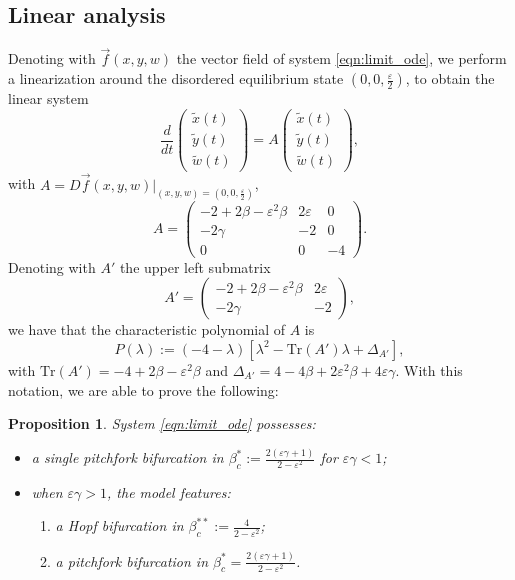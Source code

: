 \documentclass[a4paper,10pt,leqno]{amsart}
\theoremstyle{plain}
\newtheorem{prop}{Proposition}%
\begin{document}
\subsection{Linear analysis}
Denoting with $\overrightarrow{f}(x,y,w)$ the vector field of system \eqref{eqn:limit_ode}, we perform a linearization around the disordered equilibrium state $\left(0,0,\frac{\varepsilon}{2}\right)$, to obtain the linear system
\begin{equation}
\label{eqn:linear}
\frac{d}{dt}\left(\begin{matrix}
\tilde{x}(t)\\
\tilde{y}(t)\\
\tilde{w}(t)
\end{matrix} \right)= A \left(\begin{matrix}
\tilde{x}(t)\\
\tilde{y}(t)\\
\tilde{w}(t)
\end{matrix}\right),
\end{equation}
with $A = D\overrightarrow{f}(x,y,w)\vert_{(x,y,w) = \left(0,0,\frac{\varepsilon}{2}\right)}$, 
$$
A = \left(\begin{matrix}
-2 + 2\beta - \varepsilon^2 \beta & 2\varepsilon & 0\\
-2\gamma & -2 & 0\\
0 & 0 & -4
\end{matrix}\right).
$$
Denoting with $A'$ the upper left submatrix 
$$
A' =  \left(\begin{matrix}
-2 + 2\beta - \varepsilon^2 \beta & 2\varepsilon\\
-2\gamma & -2
\end{matrix}\right),
$$
we have that the characteristic polynomial of $A$ is
\begin{equation}
\label{eqn:poly}
P(\lambda):= (-4-\lambda)\left[\lambda^2 - \text{Tr}(A')\lambda + \Delta_{A'}\right],
\end{equation}
with $\text{Tr}(A') = -4 + 2\beta - \varepsilon^2 \beta$ and $\Delta_{A'} = 4 - 4\beta + 2\varepsilon^2 \beta + 4\varepsilon\gamma$.
With this notation, we are able to prove the following:
\begin{prop}
System \eqref{eqn:limit_ode} possesses:
\begin{itemize}
\item a single pitchfork bifurcation in $\beta^*_c := \frac{2(\varepsilon\gamma + 1)}{2 - \varepsilon^2}$ for $\varepsilon \gamma < 1$;
\item when $\varepsilon \gamma > 1$, the model features:
\begin{enumerate}
\item a  Hopf bifurcation in $\beta^{**}_c := \frac{4}{2-\varepsilon^2}$;
\item a pitchfork bifurcation in $\beta^*_c = \frac{2(\varepsilon\gamma + 1)}{2 - \varepsilon^2}$.
\end{enumerate}
\end{itemize}
\end{prop}
\end{document}
